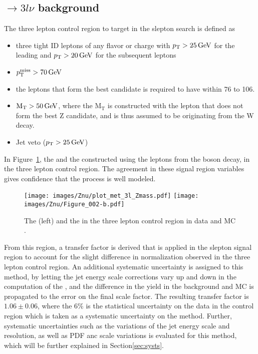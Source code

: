 \subsection*{\PWZ$\rightarrow3l\nu$ background}
\noindent
\justify
The three lepton control region to target \PWZ in the slepton search is defined as
\begin{itemize}
    \item three tight ID leptons of any flavor or charge with $p_{\mathrm{T}}>25\,\text{Ge\hspace{-.08em}V}$ for the leading and $p_{\mathrm{T}}>20\,\text{Ge\hspace{-.08em}V}$ for the subsequent leptons
    \item $p_{\mathrm{T}}^\text{miss}>70\,\text{Ge\hspace{-.08em}V}$
    \item the leptons that form the best \PZ candidate is required to have \mll within 76 to 106\GeV.
    \item $\mathrm{M_{T}}>50\,\text{Ge\hspace{-.08em}V}$, where the $\mathrm{M_{T}}$ is constructed with the lepton that does not form the best Z candidate, and is thus assumed to be originating from the W decay.
    \item Jet veto ($p_{\mathrm{T}}>25\,\text{Ge\hspace{-.08em}V}$)
\end{itemize}
\newpara
\noindent\justify
In Figure~\ref{fig:WZmet}, the \ptmiss and the \mttwo constructed using the leptons from the \PZ boson decay, in the three lepton control region.
The agreement in these signal region variables gives confidence that the \PWZ process is well modeled.
\begin{figure}[htbp!]
\begin{center}
\texttt{[image: images/Znu/plot\_met\_3l\_Zmass.pdf]}
\texttt{[image: images/Znu/Figure\_002-b.pdf]}
\caption{The \ptmiss (left) and the \mttwo in the three lepton control region in data and MC \cite{Sirunyan:2018nwe}. }
\label{fig:WZmet}
\end{center}
\end{figure}
From this region, a transfer factor is derived that is applied in the slepton signal region to account for the slight difference in normalization observed in the three lepton control region.
An additional systematic uncertainty is assigned to this method, by letting the jet energy scale corrections vary up and down in the computation of the \ptmiss, and the difference in the yield in the     background and \PWZ MC is propagated to the error on the final scale factor.
The resulting transfer factor is $1.06\pm0.06$, where the 6\% is the statistical uncertainty on the data in the control region which is taken as a systematic uncertainty on the method.
Further, systematic uncertainties such as the variations of the jet energy scale and resolution, as well as PDF anc scale variations is evaluated for this method, which will be further explained in Section\ref{sec:systs}.
